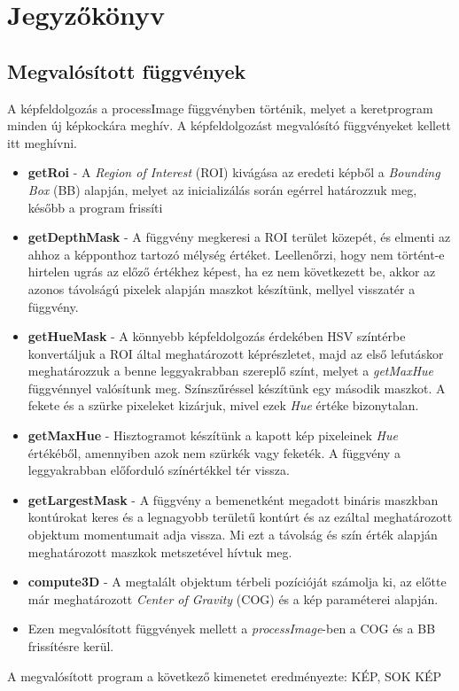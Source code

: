 \chapter{Jegyzőkönyv}

\section{Megvalósított függvények}
A képfeldolgozás a processImage függvényben történik, melyet a keretprogram minden új képkockára meghív. A képfeldolgozást megvalósító függvényeket kellett itt meghívni. 
\begin{itemize}
	\item \textbf{getRoi} - A \textit{Region of Interest} (ROI) kivágása az eredeti képből a \textit{Bounding Box} (BB) alapján, melyet az inicializálás során egérrel határozzuk meg, később a program frissíti
	\item \textbf{getDepthMask} - A függvény megkeresi a ROI terület közepét, és elmenti az ahhoz a képponthoz tartozó mélység értéket. Leellenőrzi, hogy nem történt-e hirtelen ugrás az előző értékhez képest, ha ez nem következett be, akkor az azonos távolságú pixelek alapján maszkot készítünk, mellyel visszatér a függvény.
	\item \textbf{getHueMask} - A könnyebb képfeldolgozás érdekében HSV színtérbe konvertáljuk a ROI által meghatározott képrészletet, majd az első lefutáskor meghatározzuk a benne leggyakrabban szereplő színt, melyet a \textit{getMaxHue} függvénnyel valósítunk meg. Színszűréssel készítünk egy második maszkot. A fekete és a szürke pixeleket kizárjuk, mivel ezek \textit{Hue} értéke bizonytalan.
	\item \textbf{getMaxHue} - Hisztogramot készítünk a kapott kép pixeleinek \textit{Hue} értékéből, amennyiben azok nem szürkék vagy feketék. A függvény a leggyakrabban előforduló színértékkel tér vissza.
	\item \textbf{getLargestMask} - A függvény a bemenetként megadott bináris maszkban kontúrokat keres és a legnagyobb területű kontúrt és az ezáltal meghatározott objektum momentumait adja vissza. Mi ezt a távolság és szín érték alapján meghatározott maszkok metszetével hívtuk meg.
	\item \textbf{compute3D} - A megtalált objektum térbeli pozícióját számolja ki, az előtte már meghatározott \textit{Center of Gravity} (COG) és a kép paraméterei alapján. 
	\item Ezen megvalósított függvények mellett a \textit{processImage}-ben a COG és a BB frissítésre kerül. 

\end{itemize}
A megvalósított program a következő kimenetet eredményezte:
KÉP, SOK KÉP

